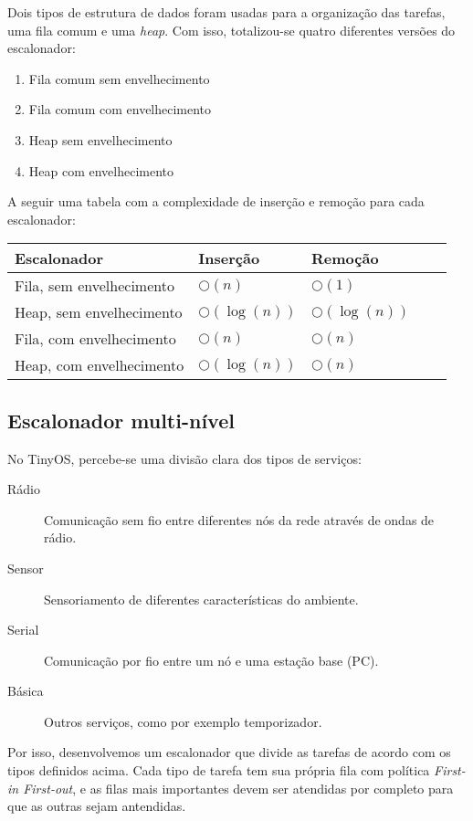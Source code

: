 \documentclass[a4paper,onecolumn, 10pt]{article}
\begin{document}
Dois tipos de estrutura de dados foram usadas para a organização das tarefas, uma fila comum e uma \textit{heap}. Com
isso, totalizou-se quatro diferentes versões do escalonador:
\begin{enumerate}
    \item Fila comum sem envelhecimento
    \item Fila comum com envelhecimento
    \item Heap sem envelhecimento
    \item Heap com envelhecimento
\end{enumerate}
A seguir uma tabela com a complexidade de inserção e remoção para cada escalonador:
\begin{center}
    \begin{tabular}{ | l | l | l | l | p{5cm} |}
    \hline
    Escalonador & Inserção & Remoção \\ \hline
    Fila, sem envelhecimento & $\bigcirc(n)$ & $\bigcirc(1)$ \\ \hline 
    Heap, sem envelhecimento & $\bigcirc(\log(n))$ & $\bigcirc(\log(n))$ \\ \hline
    Fila, com envelhecimento & $\bigcirc(n)$ & $\bigcirc(n)$ \\ \hline
    Heap, com envelhecimento & $\bigcirc(\log(n))$ & $\bigcirc(n)$ \\ \hline
    \end{tabular}
\end{center}

\subsection{Escalonador multi-nível}
No TinyOS, percebe-se uma divisão clara dos tipos de serviços: 
\begin{description}
    \item[Rádio] Comunicação sem fio entre diferentes nós da rede através de ondas de rádio.
    \item[Sensor] Sensoriamento de diferentes características do ambiente.
    \item[Serial] Comunicação por fio entre um nó e uma estação base (PC).
    \item[Básica] Outros serviços, como por exemplo temporizador.
\end{description}
Por isso, desenvolvemos um escalonador que divide as tarefas de acordo com os tipos definidos acima.
Cada tipo de tarefa tem sua própria fila com política \textit{First-in First-out}, e as filas mais importantes devem ser
atendidas por completo para que as outras sejam antendidas.
\end{document}
